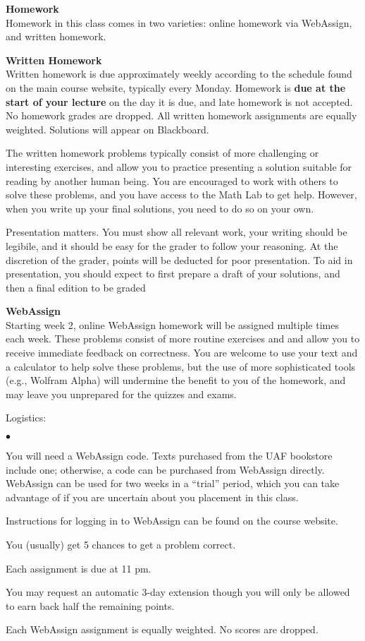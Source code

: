 \documentclass[12pt]{article}
\renewcommand{\emph}[1]{\textsf{\textbf{#1}}}
\newcommand{\localhead}[1]{\par\smallskip\textbf{#1}\nobreak\\}%
\def\heading#1{\localhead{\large\emph{#1}}}
\def\subheading#1{\localhead{\emph{#1}}}
\newenvironment{clist}%
{\bgroup\parskip 0pt\begin{list}{$\bullet$}{\partopsep 4pt\topsep 0pt\itemsep -2pt}}%
{\end{list}\egroup}%
\begin{document}
\heading{Homework}
Homework in this class comes in two varieties: online homework via WebAssign,
and written homework.

\subheading{Written Homework}
Written homework is due approximately weekly according to the schedule
found on the main course website, typically every Monday.  
Homework is \textbf{due at the start of your lecture} 
on the day it is due, and
late homework is not accepted. No homework grades are dropped. All written homework assignments are equally weighted. Solutions will appear on Blackboard. 

The written homework problems typically consist of more challenging
or interesting exercises, and allow you to practice presenting 
a solution suitable for reading by another human being. You are 
encouraged to work with others to solve these problems, and you 
have access to the Math Lab to get help.  However, when you 
write up your final solutions, you need to do so on your own.

Presentation matters. You must show all relevant work, your writing
should be legibile, and it should be easy for the grader to follow
your reasoning. At the discretion of the grader, points will be deducted 
for poor presentation.  To aid in presentation, you should expect
to first prepare a draft of your solutions, and then a final edition to
be graded

\subheading{WebAssign} 
Starting week 2, online WebAssign homework will be assigned multiple times each week. These problems consist of more routine exercises and and allow
you to receive immediate feedback on correctness.  You are welcome
to use your text and a calculator to help solve these problems, but
the use of more sophisticated tools (e.g., Wolfram Alpha) will undermine
the benefit to you of the homework, and may leave you unprepared for
the quizzes and exams.

Logistics:
\begin{clist}
\item You will need a WebAssign code.  Texts purchased from the UAF 
bookstore include one; otherwise, a code can be purchased from
WebAssign directly. WebAssign can be used for two weeks in a ``trial''
period, which you can take advantage of if you are uncertain about
you placement in this class.
\item Instructions for logging in to WebAssign can be found on the course website.
\item You (usually) get 5 chances to get a problem correct. 
\item Each assignment is due at 11 pm. 
\item You may request an automatic 3-day extension though you will only be allowed to earn back half the remaining points. 
\item Each WebAssign assignment is equally weighted. No scores are dropped.
\end{clist}
\end{document}
